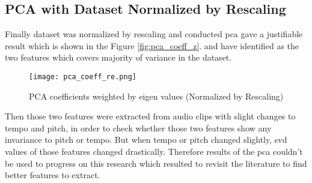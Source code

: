 \subsection{PCA with Dataset Normalized by Rescaling}

Finally dataset was normalized by rescaling and conducted \ac{pca} gave a justifiable result
which is shown in the Figure \ref{fig:pca_coeff_z}.  and  have identified as the two features which covers majority of variance
in the dataset. 

\begin{figure}[H]
    \centering
    \texttt{[image: pca\_coeff\_re.png]}
    \caption{PCA coefficients weighted by eigen values (Normalized by Rescaling)}
    \label{fig:pca_coeff_re}
\end{figure}

Then those two features were extracted from audio clips with slight changes to tempo and pitch, in order 
to check whether those two features show any invariance to pitch or tempo. But when tempo or pitch changed
slightly, \ac{svd} values of those features changed drastically. Therefore results of the \ac{pca} couldn't
be used to progress on this research which resulted to revisit the literature to find better features to 
extract. 